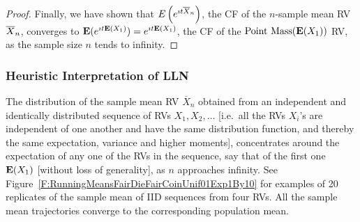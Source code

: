 \begin{prop}
{\begin{proof}
Finally, we have shown that $E \left( e^{\imath t \overline{X}_n}\right)$, the CF of the $n$-sample mean RV $\overline{X}_n$, converges to $\mathbf{E}(e^{\imath t \mathbf{E}(X_1)})=e^{\imath t \mathbf{E}(X_1)}$, the CF of the $\mbox{{\rm Point~Mass}}(\mathbf{E}(X_1))$ RV, as the sample size $n$ tends to infinity.
\end{proof}
}
\end{prop}


\subsubsection{Heuristic Interpretation of LLN}  
The distribution of the sample mean RV $\overline{X}_n$ obtained from an independent and identically distributed sequence of RVs $X_1,X_2,\ldots$ {\scriptsize [i.e.~all the RVs $X_i$'s are independent of one another and have the same distribution function, and thereby the same expectation, variance and higher moments]}, concentrates around the expectation of any one of the RVs in the sequence, say that of the first one $\mathbf{E}(X_1)$ {\scriptsize [without loss of generality]}, as $n$ approaches infinity.  See Figure~\ref{F:RunningMeansFairDieFairCoinUnif01Exp1By10} for examples of 20 replicates of the sample mean of IID sequences from four RVs.  All the sample mean trajectories converge to the corresponding population mean. 

